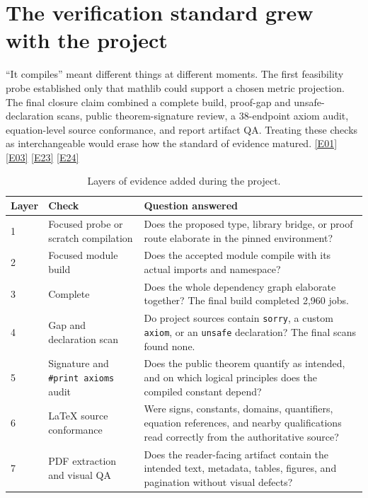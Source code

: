 \documentclass[11pt,a4paper]{article}
\newcommand{\artifact}[1]{\texttt{\detokenize{#1}}}
\newcommand{\ev}[1]{%
  \hyperref[ev:#1]{\textcolor{ReportBlue}{\textsf{\scriptsize[#1]}}}}
\begin{document}
\section{The verification standard grew with the project}
\label{sec:verification-standard}

``It compiles'' meant different things at different moments. The first feasibility
probe established only that mathlib could support a chosen metric projection. The
final closure claim combined a complete build, proof-gap and unsafe-declaration
scans, public theorem-signature review, a 38-endpoint axiom audit, equation-level
source conformance, and report artifact QA. Treating these checks as interchangeable
would erase how the standard of evidence matured. \ev{E01}\ev{E03}\ev{E23}\ev{E24}

\begin{table}[htbp]
\centering
\caption{Layers of evidence added during the project.}
\label{tab:verification-layers}
\begin{tabularx}{\linewidth}{@{}C{11mm}L{39mm}Y@{}}
\toprule
\textbf{Layer} & \textbf{Check} & \textbf{Question answered} \\
 & Focused probe or scratch compilation &
Does the proposed type, library bridge, or proof route elaborate in the pinned
environment? \\
2 & Focused module build &
Does the accepted module compile with its actual imports and namespace? \\
3 & Complete \artifact{lake build} &
Does the whole dependency graph elaborate together? The final build completed 2,960
jobs. \\
4 & Gap and declaration scan &
Do project sources contain \texttt{sorry}, a custom \texttt{axiom}, or an
\texttt{unsafe} declaration? The final scans found none. \\
5 & Signature and \texttt{\#print axioms} audit &
Does the public theorem quantify as intended, and on which logical principles does
the compiled constant depend? \\
6 & LaTeX source conformance &
Were signs, constants, domains, quantifiers, equation references, and nearby
qualifications read correctly from the authoritative source? \\
7 & PDF extraction and visual QA &
Does the reader-facing artifact contain the intended text, metadata, tables,
figures, and pagination without visual defects? \\
\bottomrule
\end{tabularx}
\end{table}
\end{document}
